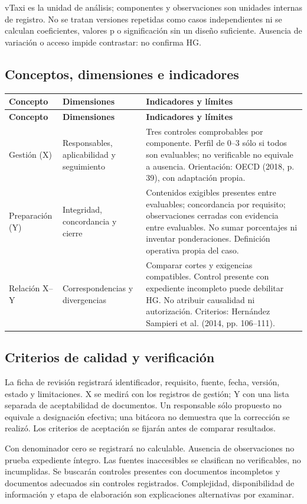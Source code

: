 {vTaxi es la unidad de análisis; componentes y observaciones son unidades internas de registro. No se tratan versiones repetidas como casos independientes ni se calculan coeficientes, valores p o significación sin un diseño suficiente. Ausencia de variación o acceso impide contrastar: no confirma HG.

\subsection{Conceptos, dimensiones e indicadores}
\begin{longtable}{@{}p{.18\linewidth}p{.25\linewidth}p{.46\linewidth}@{}}
\toprule\textbf{Concepto} & \textbf{Dimensiones} & \textbf{Indicadores y límites}\\\midrule\endfirsthead
\toprule\textbf{Concepto} & \textbf{Dimensiones} & \textbf{Indicadores y límites}\\\midrule\endhead
Gestión (X) & Responsables, aplicabilidad y seguimiento & Tres controles comprobables por componente. Perfil de 0--3 sólo si todos son evaluables; no verificable no equivale a ausencia. Orientación: OECD (2018, p. 39), con adaptación propia.\\
Preparación (Y) & Integridad, concordancia y cierre & Contenidos exigibles presentes entre evaluables; concordancia por requisito; observaciones cerradas con evidencia entre evaluables. No sumar porcentajes ni inventar ponderaciones. Definición operativa propia del caso.\\
Relación X--Y & Correspondencias y divergencias & Comparar cortes y exigencias compatibles. Control presente con expediente incompleto puede debilitar HG. No atribuir causalidad ni autorización. Criterios: Hernández Sampieri et al. (2014, pp. 106--111).\\
\bottomrule\end{longtable}

\subsection{Criterios de calidad y verificación}
La ficha de revisión registrará identificador, requisito, fuente, fecha, versión, estado y limitaciones. X se medirá con los registros de gestión; Y con una lista separada de aceptabilidad de documentos. Un responsable sólo propuesto no equivale a designación efectiva; una bitácora no demuestra que la corrección se realizó. Los criterios de aceptación se fijarán antes de comparar resultados.

Con denominador cero se registrará no calculable. Ausencia de observaciones no prueba expediente íntegro. Las fuentes inaccesibles se clasifican no verificables, no incumplidas. Se buscarán controles presentes con documentos incompletos y documentos adecuados sin controles registrados. Complejidad, disponibilidad de información y etapa de elaboración son explicaciones alternativas por examinar.

}
